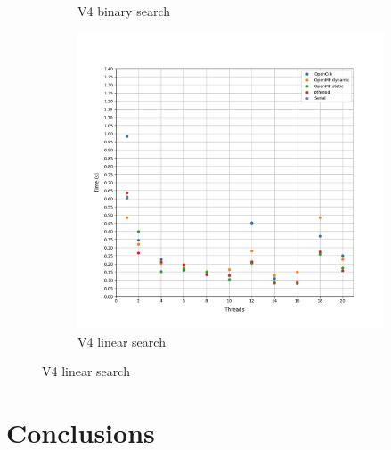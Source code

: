 \documentclass[12pt, a4paper]{article}
\begin{document}
\begin{figure}[h!]
\begin{subfigure}[b]{0.33\textwidth}
         \caption{V4 binary search}
     \end{subfigure}
     \begin{subfigure}[b]{0.33\textwidth}
         \centering
         \includegraphics[height=.4\textheight, width=\textwidth, keepaspectratio]{assets/NACA0015/v4_linear.png}
         \caption{V4 linear search} 
     \end{subfigure}
\end{figure}


\section{Conclusions}
\vspace{0.5cm}
\end{document}
